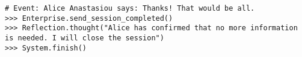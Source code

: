 \begin{lstlisting}[breaklines=true, caption={An annotated exemplar in the summarization domain.}, label={lst:exemplar2}]
# Event: Alice Anastasiou says: Thanks! That would be all.
>>> Enterprise.send_session_completed()
>>> Reflection.thought("Alice has confirmed that no more information is needed. I will close the session")
>>> System.finish()
\end{lstlisting} 






















